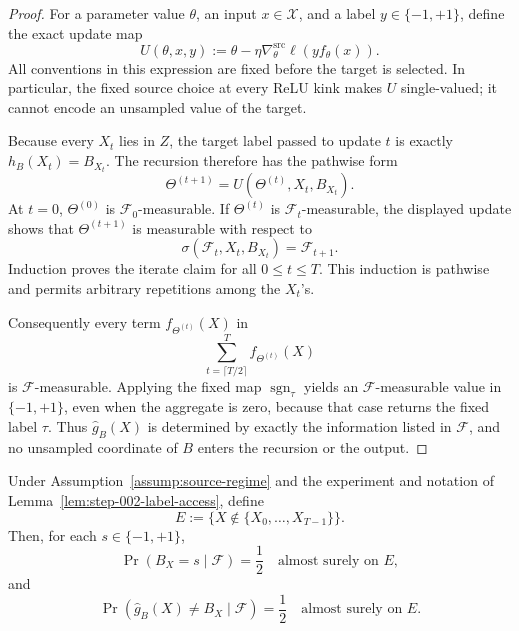 \begin{proof}
For a parameter value $\theta$, an input $x\in\mathcal X$, and a label
$y\in\{-1,+1\}$, define the exact update map
\[
U(\theta,x,y):=\theta-\eta\nabla^{\mathrm{src}}_\theta
\ell\!\left(y f_\theta(x)\right).
\]
All conventions in this expression are fixed before the target is selected.
In particular, the fixed source choice at every ReLU kink makes $U$
single-valued; it cannot encode an unsampled value of the target.

Because every $X_t$ lies in $Z$, the target label passed to update $t$ is
exactly $h_B(X_t)=B_{X_t}$.  The recursion therefore has the pathwise form
\[
\Theta^{(t+1)}=U\!\left(\Theta^{(t)},X_t,B_{X_t}\right).
\]
At $t=0$, $\Theta^{(0)}$ is $\mathscr F_0$-measurable.  If
$\Theta^{(t)}$ is $\mathscr F_t$-measurable, the displayed update shows that
$\Theta^{(t+1)}$ is measurable with respect to
\[
\sigma(\mathscr F_t,X_t,B_{X_t})=\mathscr F_{t+1}.
\]
Induction proves the iterate claim for all $0\leq t\leq T$.  This induction
is pathwise and permits arbitrary repetitions among the $X_t$'s.

Consequently every term $f_{\Theta^{(t)}}(X)$ in
\[
\sum_{t=\lceil T/2\rceil}^{T}f_{\Theta^{(t)}}(X)
\]
is $\mathscr F$-measurable.  Applying the fixed map
$\operatorname{sgn}_{\tau}$ yields an $\mathscr F$-measurable value in
$\{-1,+1\}$, even when the aggregate is zero, because that case returns the
fixed label $\tau$.  Thus $\widehat g_B(X)$ is determined by exactly the
information listed in $\mathscr F$, and no unsampled coordinate of $B$ enters
the recursion or the output.
\end{proof}

\begin{lemma}
\label{lem:step-002-unseen-label}
Under Assumption~\ref{assump:source-regime} and the experiment and notation of
Lemma~\ref{lem:step-002-label-access}, define
\[
E:=\{X\notin\{X_0,\ldots,X_{T-1}\}\}.
\]
Then, for each $s\in\{-1,+1\}$,
\[
\Pr(B_X=s\mid\mathscr F)=\frac12
\quad\text{almost surely on }E,
\]
and
\[
\Pr\!\left(\widehat g_B(X)\ne B_X\mid\mathscr F\right)
=\frac12
\quad\text{almost surely on }E.
\]
\end{lemma}

